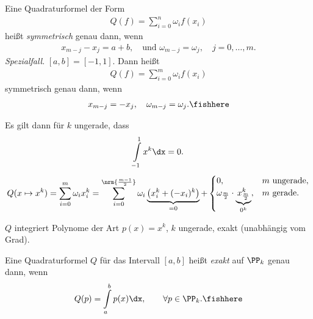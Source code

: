 \begin{defn}
\label{defn:4.2}
Eine Quadraturformel der Form
\begin{align*}
Q(f) = \sum\limits_{i=0}^n \omega_i f(x_i)
\end{align*}
heißt \emph{symmetrisch} genau dann, wenn
\begin{align*}
x_{m-j} - x_{j} = a+b,\quad\text{und }\omega_{m-j} = \omega_j,\quad
j=0,\ldots,m.
\end{align*}
\textit{Spezialfall}. $[a,b]=[-1,1]$. Dann heißt
\begin{align*}
Q(f) = \sum\limits_{i=0}^m \omega_i f(x_i)
\end{align*}
symmetrisch genau dann, wenn
\begin{align*}
x_{m-j} = -x_j,\quad \omega_{m-j} = \omega_j.\fishhere
\end{align*}
\end{defn}
Es gilt dann für $k$ ungerade, dass
\begin{align*}
\int\limits_{-1}^1 x^k\dx = 0.
\end{align*}
\begin{align*}
Q(x\mapsto x^k) = \sum\limits_{i=0}^m \omega_i x_i^k =
\sum\limits_{i=0}^{\nrm{\frac{m-1}{2}}} \omega_i \underbrace{\left(x_i^k +
(-x_i)^k \right)}_{=0}
+
\begin{cases}
0, & m\text{ ungerade},\\
\omega_{\frac{m}{2}}\cdot \underbrace{x_{\frac{m}{2}}^k}_{0^k} , & m\text{
gerade}.
\end{cases}
\end{align*}
\begin{corn}
$Q$ integriert Polynome der Art $p(x)=x^k$, $k$ ungerade, exakt (unabhängig vom
Grad).\fishhere
\end{corn}

\begin{defn}
\label{defn:4.3}
Eine Quadraturformel $Q$ für das Intervall $[a,b]$ heißt \emph{exakt} auf
$\PP_k$ genau dann, wenn
\begin{align*}
Q(p) = \int\limits_a^b p(x)\dx,\qquad \forall p\in\PP_k.\fishhere
\end{align*}
\end{defn}

